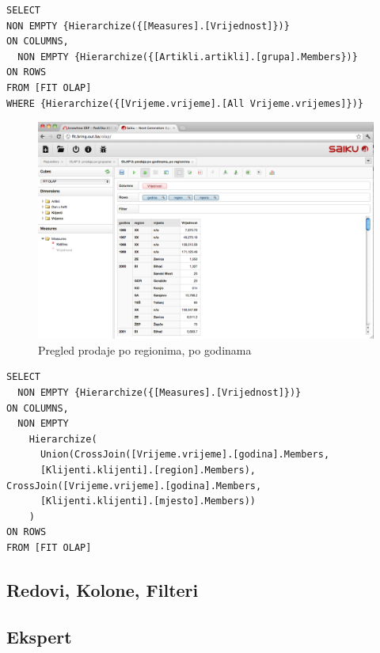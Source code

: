 \documentclass[times, utf8, seminar]{fit}
\begin{document}
\begin{lstlisting}
SELECT
NON EMPTY {Hierarchize({[Measures].[Vrijednost]})} 
ON COLUMNS,
  NON EMPTY {Hierarchize({[Artikli.artikli].[grupa].Members})} 
ON ROWS
FROM [FIT OLAP]
WHERE {Hierarchize({[Vrijeme.vrijeme].[All Vrijeme.vrijemes]})}
\end{lstlisting}


\begin{figure}[H]
\centering
\includegraphics[width=15cm]{img/saiku_rpt_region}
\caption{Pregled prodaje po regionima, po godinama}
\end{figure}

\begin{lstlisting}
SELECT
  NON EMPTY {Hierarchize({[Measures].[Vrijednost]})} 
ON COLUMNS,
  NON EMPTY 
    Hierarchize(
      Union(CrossJoin([Vrijeme.vrijeme].[godina].Members, 
      [Klijenti.klijenti].[region].Members), CrossJoin([Vrijeme.vrijeme].[godina].Members, 
      [Klijenti.klijenti].[mjesto].Members))
    ) 
ON ROWS
FROM [FIT OLAP]
\end{lstlisting}



\subsection{Redovi, Kolone, Filteri}





\subsection{Ekspert}
\end{document}
